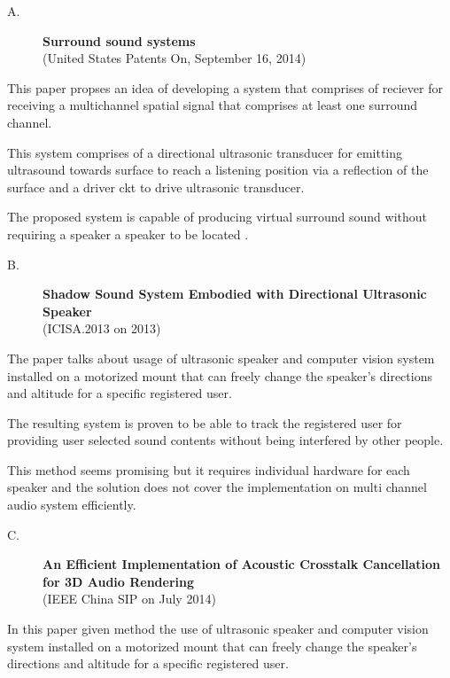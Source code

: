 \documentclass[../../../patent_v1.tex]{subfiles}
\begin{document}
    
\begin{description}
    \item[A.]\textbf{Surround sound systems}\\(United States Patents On, September 16, 2014)
\end{description}

This paper propses an idea of developing a system that comprises of 
reciever for receiving a multichannel spatial signal that comprises
at least one surround channel.

This system comprises of a directional  ultrasonic transducer for 
emitting ultrasound towards surface to reach a listening position via 
a reflection of the surface and a driver ckt to drive ultrasonic transducer.

The proposed system is capable of producing virtual surround sound without 
requiring a speaker a speaker to be located .

\begin{description}
    \item[B.]\textbf{Shadow Sound System Embodied with Directional Ultrasonic Speaker}\\(ICISA.2013 on 2013) 
\end{description}

The paper talks about usage of ultrasonic speaker and computer vision 
system installed on a motorized mount that can freely change the 
speaker’s directions and altitude for a specific registered user.

The resulting system is proven to be able to track the registered 
user for providing user selected sound contents without being 
interfered by other people.

This method seems promising but it requires individual hardware 
for each speaker and the solution does not cover the implementation 
on multi channel audio system efficiently.

\begin{description}
    \item[C.]\textbf{An Efficient Implementation of Acoustic Crosstalk Cancellation for 3D Audio Rendering}\\(IEEE China SIP on July 2014)    
\end{description}

In this paper given method the use of ultrasonic speaker and computer 
vision system installed on a motorized mount that can freely change 
the speaker’s directions and altitude for a specific registered user.
\end{document}
